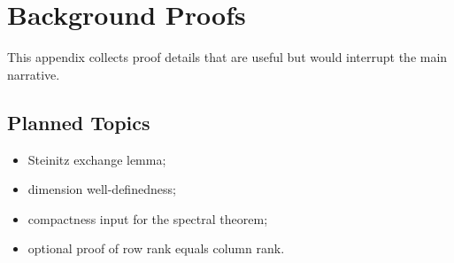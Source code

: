 \chapter{Background Proofs}
\label{app:background-proofs}

This appendix collects proof details that are useful but would interrupt the
main narrative.

\section{Planned Topics}

\begin{itemize}
  \item Steinitz exchange lemma;
  \item dimension well-definedness;
  \item compactness input for the spectral theorem;
  \item optional proof of row rank equals column rank.
\end{itemize}
